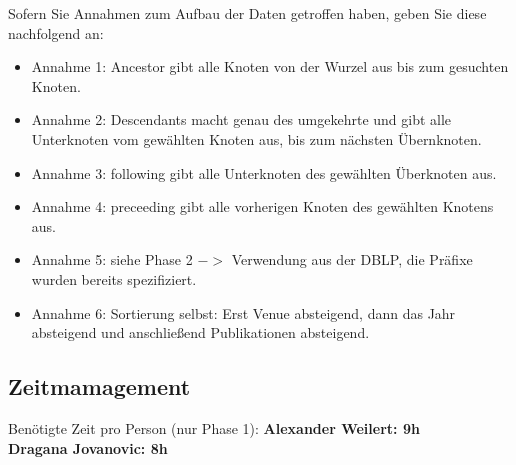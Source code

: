 \documentclass[11pt]{scrartcl}
\begin{document}
Sofern Sie Annahmen zum Aufbau der Daten getroffen haben, geben Sie diese nachfolgend an:
\begin{itemize}
	\item Annahme 1: Ancestor gibt alle Knoten von der Wurzel aus bis zum gesuchten Knoten.
    \item Annahme 2: Descendants macht genau des umgekehrte und gibt alle Unterknoten vom gewählten Knoten aus, bis zum nächsten Übernknoten.
    \item Annahme 3: following gibt alle Unterknoten des gewählten Überknoten aus.
    \item Annahme 4: preceeding gibt alle vorherigen Knoten des gewählten Knotens aus.
    \item Annahme 5: siehe Phase 2 $->$ Verwendung aus der DBLP, die Präfixe wurden bereits spezifiziert.
    \item Annahme 6: Sortierung selbst: Erst Venue absteigend, dann das Jahr absteigend und anschließend Publikationen absteigend.
\end{itemize}

\subsection*{Zeitmamagement}

Benötigte Zeit pro Person (nur Phase 1):
\textbf{Alexander Weilert: 9h} \\
\textbf{Dragana Jovanovic: 8h}
\end{document}
